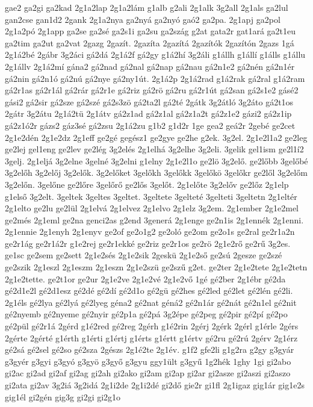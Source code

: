{gae2
ga2gi
ga2kad
2g1a2lap
2g1a2lám
g1alb
g2ali
2g1alk
3g2all
2g1als
ga2lul
gan2cse
gan1d2
2gank
2g1a2nya
ga2nyá
ga2nyó
gaó2
ga2pa.
2g1apj
ga2pol
2g1a2pó
2g1app
ga2se
ga2sé
ga2s1i
ga2su
ga2szág
g2at
gata2r
gat1ará
ga2t1eu
ga2tim
ga2ut
ga2vat
2gazg
2gazít.
2gazíta
2gazítá
2gazítók
2gazítón
2gazs
1gá
2g1á2bé
2gábr
3g2áci
gá2dá
2g1á2f
gá2gy
g1á2hí
3g2áli
g1állh
g1állí
g1álls
g1állu
2g1állv
2g1á2mí
gána2
gá2nad
gá2nal
gá2nap
gá2nau
gá2n1e2
gá2nén
gá2n1ér
gá2nin
gá2n1ó
gá2nú
gá2nye
gá2ny1út.
2g1á2p
2g1á2rad
g1á2rak
gá2ral
g1á2ram
gá2r1as
gá2r1ál
gá2rár
gá2r1e
gá2riz
gá2rö
gá2ru
gá2r1út
gá2san
gá2s1e2
gásé2
gási2
gá2sir
gá2sze
gá2szé
gá2s3zö
gá2ta2l
gá2té
2gátk
3g2átló
3g2áto
gá2t1os
2gátr
3g2átu
2g1á2tü
2g1átv
gá2z1ad
gá2z1al
gá2z1a2t
gá2z1e2
gázi2
gá2z1ip
gá2z1ó2r
gázs2
gáz3sé
gá2zsu
2g1á2zu
g1b2
g1d2r
1ge
gea2
geá2r
2gebé
ge2cet
2g1e2dén
2g1e2dz
2g1eff
ge2gé
gegész1
ge2gye
ge2he
g2ek.
3g2el.
2g1e2l1a2
ge2leg
ge2lej
gel1eng
ge2lev
ge2lég
3g2elés
2g1elhá
3g2elhe
3g2eli.
3gelik
gel1ism
ge2l1í2
3gelj.
2g1eljá
3g2elne
3gelné
3g2elni
g1elny
2g1e2l1o
ge2lö
3g2elő.
ge2lőbb
3gelőbé
3g2előh
3g2előj
3g2elők.
3g2előket
3gelőkh
3gelőkk
3gelőkö
3gelőkr
ge2lől
3g2előm
3g2előn.
3gelőne
ge2lőre
3gelőrő
ge2lős
3gelőt.
2g1előte
3g2előv
ge2lőz
2g1elp
g1első
3g2elt.
3geltek
3geltes
3geltet.
3geltete
3gelteté
3gelteti
3geltetn
2g1eltér
2g1elto
ge2lu
ge2lül
2g1elvá
2g1elvez
2g1elvo
2g1elz
3g2em.
2g1ember
2g1e2mel
ge2més
2g1eml
ge2na
genci2as
g2end
3generá
2g1enge
ge2n1is
2g1ennék
2g1enni.
2g1ennie
2g1enyh
2g1enyv
ge2of
ge2o1g2
ge2oló
ge2om
ge2o1s
ge2ral
ge2r1a2n
ge2r1ág
ge2r1á2r
g1e2rej
ge2r1ekké
ge2riz
ge2r1os
ge2rö
2g1e2rő
ge2rű
3g2es.
ge1sc
ge2sem
ge2sett
2g1e2sés
2g1e2sik
2geskü
2g1e2ső
ge2sú
2gesze
ge2szé
ge2szik
2g1eszl
2g1eszm
2g1eszn
2g1e2szü
ge2szű
g2et.
ge2ter
2g1e2tete
2g1e2tetn
2g1e2tette.
ge2t1or
ge2ur
2g1e2ve
2g1e2vé
2g1e2vő
1gé
gé2ber
2g1ébr
gé2da
gé2d1e2l
gé2d1esz
gé2dé
gé2dí
gé2d1o
gé2gü
gé2hes
gé2led
gé2let
gé2lén
gé2li.
2g1éls
gé2lya
gé2lyá
gé2lyeg
géna2
gé2nat
géná2
gé2n1ár
gé2nát
gé2n1el
gé2nit
gé2nyemb
gé2nyeme
gé2nyir
gé2p1a
gé2pá
3g2épe
gé2peg
gé2pir
gé2pí
gé2po
gé2pül
gé2r1á
2gérd
g1é2red
gé2reg
2gérh
g1é2rin
2gérj
2gérk
2gérl
g1érle
2gérs
2gérte
2gérté
g1érth
g1érti
g1értj
g1érts
g1értt
g1értv
gé2ru
gé2rú
2gérv
2g1érz
gé2sá
gé2sel
gé2so
gé2sza
2gészs
2g1é2te
2g1év.
g1f2
gfe2li
g1g2ra
g2gy
g3gyár
g3gyér
g3gyi
g3gyó
g3gyö
g3győ
g3gyu
ggy1ült
g3gyű
1g2hék
1ghy
1gi
gi2abo
gi2ac
gi2ad
gi2af
gi2ag
gi2ah
gi2ako
gi2am
gi2ap
gi2ar
gi2asze
gi2aszi
gi2aszo
gi2ata
gi2av
3g2iá
3g2idá
2g1i2de
2g1i2dé
gi2dő
gie2r
gi1fl
2g1igaz
gig1ár
gig1e2s
gig1él
gi2gén
gig3g
gi2gi
gi2g1o
}
